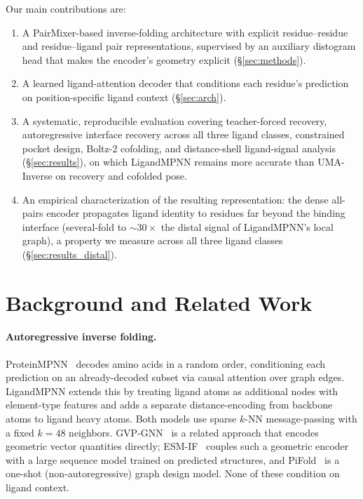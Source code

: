 \documentclass[11pt,letterpaper]{article}
\begin{document}
Our main contributions are:
\begin{enumerate}
  \item A PairMixer-based inverse-folding architecture with explicit residue--residue and
        residue--ligand pair representations, supervised by an auxiliary distogram head that makes
        the encoder's geometry explicit (\S\ref{sec:methods}).
  \item A learned ligand-attention decoder that conditions each residue's prediction on
        position-specific ligand context (\S\ref{sec:arch}).
  \item A systematic, reproducible evaluation covering teacher-forced recovery, autoregressive
        interface recovery across all three ligand classes, constrained pocket design, Boltz-2
        cofolding, and distance-shell ligand-signal analysis (\S\ref{sec:results}), on which
        LigandMPNN remains more accurate than UMA-Inverse on recovery and cofolded pose.
  \item An empirical characterization of the resulting representation: the dense all-pairs encoder
        propagates ligand identity to residues far beyond the binding interface (several-fold to
        ${\sim}30\times$ the distal signal of LigandMPNN's local graph), a property we measure across
        all three ligand classes (\S\ref{sec:results_distal}).
\end{enumerate}

\section{Background and Related Work}
\label{sec:background}

\paragraph{Autoregressive inverse folding.}
ProteinMPNN~\citep{dauparas2022proteinmpnn} decodes amino acids in a random order, conditioning each
prediction on an already-decoded subset via causal attention over graph edges. LigandMPNN extends
this by treating ligand atoms as additional nodes with element-type features and adds a
separate distance-encoding from backbone atoms to ligand heavy atoms. Both models use sparse
$k$-NN message-passing with a fixed $k{=}48$ neighbors. GVP-GNN~\citep{jing2021gvp} is a
related approach that encodes geometric vector quantities directly; ESM-IF~\citep{hsu2022esmif}
couples such a geometric encoder with a large sequence model trained on predicted structures, and
PiFold~\citep{gao2023pifold} is a one-shot (non-autoregressive) graph design model. None of these
condition on ligand context.
\end{document}
